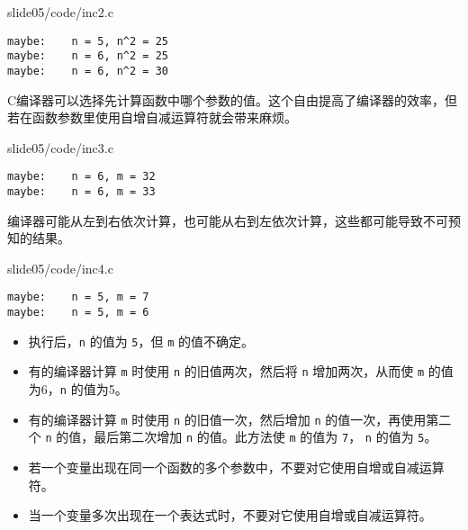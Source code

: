 \begin{frame}[fragile]
  
  {slide05/code/inc2.c} \pause 

\begin{lstlisting}[backgroundcolor=\color{red!10}]
maybe:    n = 5, n^2 = 25
maybe:    n = 6, n^2 = 25
maybe:    n = 6, n^2 = 30
\end{lstlisting} \pause 

  C编译器可以选择先计算函数中哪个参数的值。这个自由提高了编译器的效率，但若在函数参数里使用自增自减运算符就会带来麻烦。
\end{frame}

\begin{frame}[fragile]
  
  {slide05/code/inc3.c}

  \begin{lstlisting}[backgroundcolor=\color{red!10}]
maybe:    n = 6, m = 32
maybe:    n = 6, m = 33
\end{lstlisting} \pause 
编译器可能从左到右依次计算，也可能从右到左依次计算，这些都可能导致不可预知的结果。
\end{frame}

\begin{frame}[fragile]
  
  {slide05/code/inc4.c}
  \pause 
  \begin{lstlisting}[backgroundcolor=\color{red!10}]
maybe:    n = 5, m = 7
maybe:    n = 5, m = 6
\end{lstlisting} 
\end{frame}

\begin{frame}[fragile]
\begin{itemize}
\item 执行后，\lstinline|n| 的值为 \lstinline|5|，但 \lstinline|m| 的值不确定。\\[0.1in]
\item 有的编译器计算 \lstinline|m| 时使用 \lstinline|n| 的旧值两次，然后将 \lstinline|n| 增加两次，从而使 \lstinline|m| 的值为6，\lstinline|n| 的值为5。\\[0.1in]
\item 有的编译器计算 \lstinline|m| 时使用 \lstinline|n| 的旧值一次，然后增加 \lstinline|n| 的值一次，再使用第二个 \lstinline|n| 的值，最后第二次增加 \lstinline|n| 的值。此方法使 \lstinline|m| 的值为 \lstinline|7|， \lstinline|n| 的值为 \lstinline|5|。
\end{itemize}
\end{frame}

\begin{frame}[fragile]
\begin{itemize}
\item 若一个变量出现在同一个函数的多个参数中，不要对它使用自增或自减运算符。\\[0.1in]
\item 当一个变量多次出现在一个表达式时，不要对它使用自增或自减运算符。
\end{itemize}
\end{frame}
